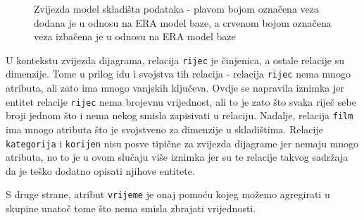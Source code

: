 \documentclass[11pt]{foi}
\begin{document}
\begin{figure}
\centering
{}
\caption{Zvijezda model skladišta podataka - plavom bojom označena veza dodana
	je u odnosu na ERA model baze, a crvenom bojom označena veza izbačena
	je u odnosu na ERA model baze}
\label{star_diagram}
\end{figure}

U kontekstu zvijezda dijagrama, relacija \texttt{rijec} je činjenica, a ostale
relacije su dimenzije. Tome u prilog idu i svojstva tih relacija - relacija
\texttt{rijec} nema mnogo atributa, ali zato ima mnogo vanjskih ključeva. Ovdje
se napravila iznimka jer entitet relacije \texttt{rijec} nema brojevnu
vrijednost, ali to je zato što svaka riječ sebe broji jednom što i nema nekog
smisla zapisivati u relaciju. Nadalje, relacija \texttt{film} ima mnogo
atributa što je svojstveno za dimenzije u skladištima. Relacije
\texttt{kategorija} i \texttt{korijen} nisu posve tipične za zvijezda dijagrame
jer nemaju mnogo atributa, no to je u ovom slučaju više iznimka jer su te
relacije takvog sadržaja da je teško dodatno opisati njihove entitete.

S druge strane, atribut \texttt{vrijeme} je onaj pomoću kojeg možemo agregirati
u skupine unatoč tome što nema smisla zbrajati vrijednosti.
\end{document}
